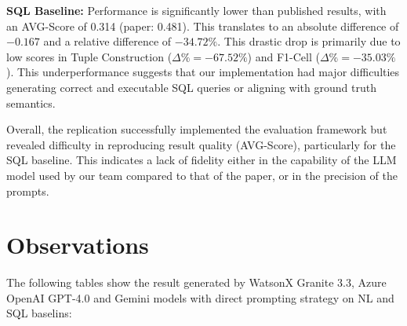 \documentclass[12pt]{article}
\begin{document}
\noindent \textbf{SQL Baseline:}  
Performance is significantly lower than published results, with an AVG-Score of 0.314 (paper: 0.481). This translates to an absolute difference of $-0.167$ and a relative difference of $-34.72\%$. This drastic drop is primarily due to low scores in Tuple Construction ($\Delta\% = -67.52\%$) and F1-Cell ($\Delta\% = -35.03\%$). This underperformance suggests that our implementation had major difficulties generating correct and executable SQL queries or aligning with ground truth semantics.

Overall, the replication successfully implemented the evaluation framework but revealed difficulty in reproducing result quality (AVG-Score), particularly for the SQL baseline. This indicates a lack of fidelity either in the capability of the LLM model used by our team compared to that of the paper, or in the precision of the prompts.


\section{Observations}

The following tables show the result generated by WatsonX Granite 3.3, Azure OpenAI GPT-4.0 and Gemini models with direct prompting strategy on NL and SQL baselins:

\begin{table}[h!]
\centering
{}
\caption{NL baseline results with Watsonx}
\end{table}

\begin{table}[h!]
\centering
{}
\caption{SQL baseline results with Watsonx}
\end{table}
\end{document}
